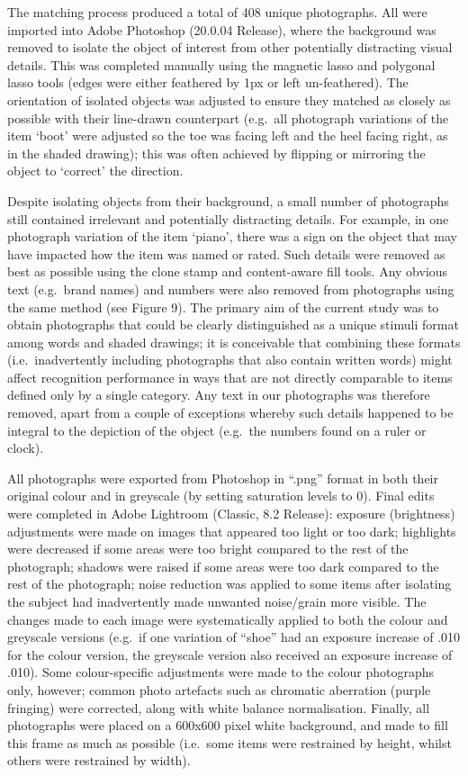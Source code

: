 \documentclass[
  11pt,
]{article}
\begin{document}
The matching process produced a total of 408 unique photographs. All
were imported into Adobe Photoshop (20.0.04 Release), where the
background was removed to isolate the object of interest from other
potentially distracting visual details. This was completed manually
using the magnetic lasso and polygonal lasso tools (edges were either
feathered by 1px or left un-feathered). The orientation of isolated
objects was adjusted to ensure they matched as closely as possible with
their line-drawn counterpart (e.g.~all photograph variations of the item
`boot' were adjusted so the toe was facing left and the heel facing
right, as in the shaded drawing); this was often achieved by flipping or
mirroring the object to `correct' the direction.

Despite isolating objects from their background, a small number of
photographs still contained irrelevant and potentially distracting
details. For example, in one photograph variation of the item `piano',
there was a sign on the object that may have impacted how the item was
named or rated. Such details were removed as best as possible using the
clone stamp and content-aware fill tools. Any obvious text (e.g.~brand
names) and numbers were also removed from photographs using the same
method (see Figure 9). The primary aim of the current study was to
obtain photographs that could be clearly distinguished as a unique
stimuli format among words and shaded drawings; it is conceivable that
combining these formats (i.e.~inadvertently including photographs that
also contain written words) might affect recognition performance in ways
that are not directly comparable to items defined only by a single
category. Any text in our photographs was therefore removed, apart from
a couple of exceptions whereby such details happened to be integral to
the depiction of the object (e.g.~the numbers found on a ruler or
clock).

All photographs were exported from Photoshop in ``.png'' format in both
their original colour and in greyscale (by setting saturation levels to
0). Final edits were completed in Adobe Lightroom (Classic, 8.2
Release): exposure (brightness) adjustments were made on images that
appeared too light or too dark; highlights were decreased if some areas
were too bright compared to the rest of the photograph; shadows were
raised if some areas were too dark compared to the rest of the
photograph; noise reduction was applied to some items after isolating
the subject had inadvertently made unwanted noise/grain more visible.
The changes made to each image were systematically applied to both the
colour and greyscale versions (e.g.~if one variation of ``shoe'' had an
exposure increase of .010 for the colour version, the greyscale version
also received an exposure increase of .010). Some colour-specific
adjustments were made to the colour photographs only, however; common
photo artefacts such as chromatic aberration (purple fringing) were
corrected, along with white balance normalisation. Finally, all
photographs were placed on a 600x600 pixel white background, and made to
fill this frame as much as possible (i.e.~some items were restrained by
height, whilst others were restrained by width).
\end{document}
